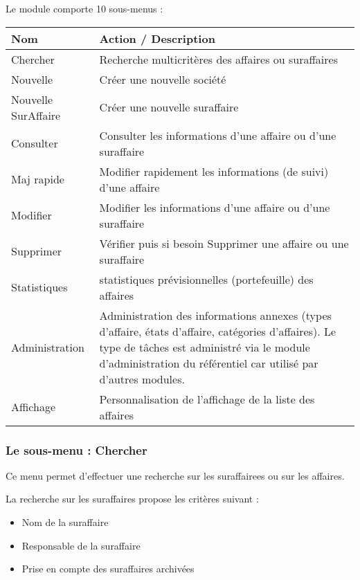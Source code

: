 Le module \deal comporte 10 sous-menus :\\

\begin{tabular}{|p{2.5cm}|p{9.5cm}|}
\hline
\textbf{Nom} & \textbf{Action / Description} \\
\hline
Chercher & Recherche multicritères des affaires ou suraffaires \\
\hline
Nouvelle & Créer une nouvelle société\\
\hline
Nouvelle SurAffaire & Créer une nouvelle suraffaire\\
\hline
Consulter & Consulter les informations d'une affaire ou d'une suraffaire\\
\hline
Maj rapide & Modifier rapidement les informations (de suivi) d'une affaire\\
\hline
Modifier & Modifier les informations d'une affaire ou d'une suraffaire\\
\hline
Supprimer & Vérifier puis si besoin Supprimer une affaire ou une suraffaire\\
\hline
Statistiques & statistiques prévisionnelles (portefeuille) des affaires\\
\hline
Administration & Administration des informations annexes (types d'affaire, états d'affaire, catégories d'affaires). Le type de tâches est administré via le module d'administration du référentiel car utilisé par d'autres modules.\\
\hline
Affichage & Personnalisation de l'affichage de la liste des affaires\\
\hline
\end{tabular}


\subsubsection{Le sous-menu : Chercher}

Ce menu permet d'effectuer une recherche sur les suraffairees ou sur les affaires.

La recherche sur les suraffaires propose les critères suivant :

\begin{itemize}
\item Nom de la suraffaire
\item Responsable de la suraffaire
\item Prise en compte des suraffaires archivées
\end{itemize}
\vspace{0.3cm}

